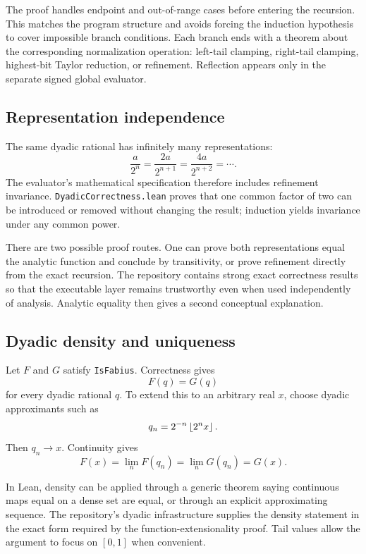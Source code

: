 \documentclass[11pt,oneside]{article}
\theoremstyle{definition}
\theoremstyle{remark}
\begin{document}
The proof handles endpoint and out-of-range cases before entering the recursion.  This matches the program structure and avoids forcing the induction hypothesis to cover impossible branch conditions.  Each branch ends with a theorem about the corresponding normalization operation: left-tail clamping, right-tail clamping, highest-bit Taylor reduction, or refinement.  Reflection appears only in the separate signed global evaluator.

\subsection{Representation independence}
The same dyadic rational has infinitely many representations:
\[
  \frac{a}{2^n}=\frac{2a}{2^{n+1}}=\frac{4a}{2^{n+2}}=\cdots.
\]
The evaluator's mathematical specification therefore includes refinement invariance.  \nolinkurl{DyadicCorrectness.lean} proves that one common factor of two can be introduced or removed without changing the result; induction yields invariance under any common power.

There are two possible proof routes.  One can prove both representations equal the analytic function and conclude by transitivity, or prove refinement directly from the exact recursion.  The repository contains strong exact correctness results so that the executable layer remains trustworthy even when used independently of analysis.  Analytic equality then gives a second conceptual explanation.

\subsection{Dyadic density and uniqueness}
Let \(F\) and \(G\) satisfy \nolinkurl{IsFabius}.  Correctness gives
\[
  F(q)=G(q)
\]
for every dyadic rational \(q\).  To extend this to an arbitrary real \(x\), choose dyadic approximants such as
\[
  q_n=2^{-n}\left\lfloor 2^n x\right\rfloor.
\]
Then \(q_n\to x\).  Continuity gives
\[
  F(x)=\lim_nF(q_n)=\lim_nG(q_n)=G(x).
\]

In Lean, density can be applied through a generic theorem saying continuous maps equal on a dense set are equal, or through an explicit approximating sequence.  The repository's dyadic infrastructure supplies the density statement in the exact form required by the function-extensionality proof.  Tail values allow the argument to focus on \([0,1]\) when convenient.
\end{document}
